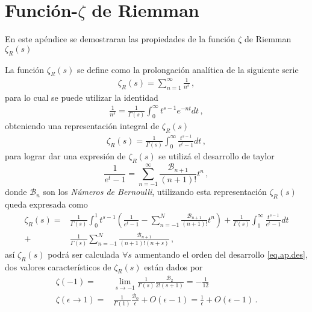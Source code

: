 \chapter{Función-\texorpdfstring{$\zeta$}{}  de Riemman} \label{Apendice.2}

En este apéndice se demostraran las propiedades de la función $\zeta$ de Riemman $\zeta _R (s)$

La función $\zeta _R (s)$ se define como la prolongación analítica de la siguiente serie
\begin{align}
	\zeta _R (s) = 
	\sum _{n=1} ^{\infty} \frac{1}{n ^{s}}
	\, ,
\end{align}
para lo cual se puede utilizar la identidad
\begin{align}
	\frac{1}{n ^{s}} =
	\frac{1}{\Gamma (s)} 
	\int _0 ^{\infty} t^{s-1} e ^{-n t}  dt
	\, ,
\end{align}
obteniendo una representación integral de $\zeta _R (s)$
\begin{align}
	\zeta _R (s) = 
	\frac{1}{\Gamma (s)}
	\int _0 ^\infty
	\frac{t ^{s-1}}{e ^t -1} dt
	\, ,
\end{align}
para lograr dar una expresión de $\zeta _R (s) $ se utilizá el desarrollo de taylor 
\begin{equation}
	\frac{1}{e ^t -1} = 
	\sum _{n=-1} ^{\infty}
	\frac{ \mathcal{B} _{n+1}}{(n+1)!} t ^n
	\, ,
\label{eq.ap.des}
\end{equation}
donde $\mathcal{B} _{n}$ son los {\it Números de Bernoulli}, utilizando esta representación $\zeta _R (s)$ queda expresada como
\begin{align}
	\zeta _R (s) = 
&
	\frac{1}{\Gamma (s)}
	\int _0 ^1 
	t ^{s-1} 
	\left(	
		\frac{1}{e ^t -1} -
		\sum _{n=-1} ^{N}
		\frac{ \mathcal{B} _{n+1}}{(n+1)!} t ^n	
		\right)		
		+
	\frac{1}{\Gamma (s)}
	\int _1 ^\infty
	\frac{t ^{s-1}}{e ^t -1} dt
\\
	+
&
	\frac{1}{\Gamma (s)}
	\sum _{n=-1} ^{N}
	\frac{ \mathcal{B} _{n+1}}{ (n+1)! (n + s)}
	\, ,
\end{align}
así $\zeta _R (s)$ podrá ser calculada $\forall s $ aumentando el orden del desarrollo \eqref{eq.ap.des}, dos valores característicos de $\zeta _R (s)$ están dados por
\begin{align}
	\zeta (-1) = 
&
	\lim _{s \rightarrow -1}
			\frac{1}{\Gamma (s)} \frac{\mathcal{B} _2}{2! (s+1)}
			 =
	- \frac{1}{12}
\\
	\zeta (\epsilon \rightarrow 1) =
& 
	\frac{1}{\Gamma (1)} \frac{\mathcal{B} _0}{ \epsilon} + O (\epsilon -1 ) = 
	\frac{1}{ \epsilon} + O (\epsilon -1 ) 
	\, .
\end{align}

